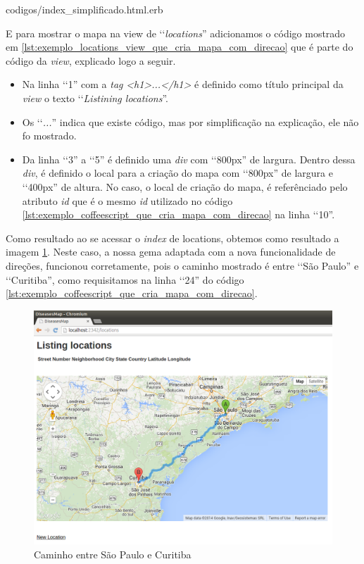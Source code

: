 
{codigos/index_simplificado.html.erb}

E para mostrar o mapa na view de ‘‘\emph{locations}'' adicionamos o código mostrado em
\ref{lst:exemplo_locations_view_que_cria_mapa_com_direcao}
que é parte do código da \emph{view}, explicado logo a seguir.

\begin{itemize}

 \item Na linha ‘‘1'' com a \emph{tag} \emph{<h1>...</h1>} é definido como título principal da \emph{view} o
 texto ‘‘\emph{Listining locations}''.
 
 \item Os ‘‘\emph{...}'' indica que existe código, mas por simplificação na explicação, ele não fo mostrado.
 
 \item Da linha ‘‘3'' a ‘‘5'' é definido uma \emph{div} com ‘‘800px'' de largura. Dentro dessa \emph{div},
 é definido o local para a criação do mapa com ‘‘800px'' de largura e ‘‘400px'' de altura. No caso, o local 
 de criação do mapa, é referênciado pelo atributo \emph{id} que é o mesmo \emph{id} utilizado no código 
 \ref{lst:exemplo_coffeescript_que_cria_mapa_com_direcao} na linha ‘‘10''.  
 
\end{itemize}

Como resultado ao se acessar o \emph{index} de locations, obtemos como resultado a imagem
\ref{fig:caminho_entre_sao_paulo_e_curitiba}. Neste caso, a nossa gema adaptada com a nova funcionalidade
de direções, funcionou corretamente, pois o caminho mostrado é entre ‘‘São Paulo'' e ‘‘Curitiba'', como
requisitamos na linha ‘‘24'' do código \ref{lst:exemplo_coffeescript_que_cria_mapa_com_direcao}.

\begin{figure}[ht]
  \begin{center}       
    \includegraphics[scale=0.35]{images/caminho_entre_sao_paulo_e_curitiba.png}
    \caption{Caminho entre São Paulo e Curitiba}
    \label{fig:caminho_entre_sao_paulo_e_curitiba}
  \end{center}    
\end{figure}